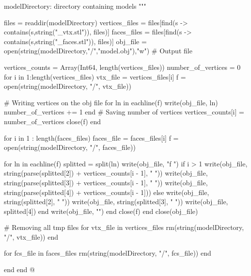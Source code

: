 \documentclass[11pt,oneside]{article}	%
\begin{document}
{  modelDirectory: directory containing models
  """

  files = readdir(modelDirectory)
  vertices_files = files[find(s -> contains(s,string("_vtx.stl")), files)]
  faces_files = files[find(s -> contains(s,string("_faces.stl")), files)]
  obj_file = open(string(modelDirectory,"/","model.obj"),"w") # Output file

  vertices_counts = Array(Int64, length(vertices_files))
  number_of_vertices = 0
  for i in 1:length(vertices_files)
    vtx_file = vertices_files[i]
    f = open(string(modelDirectory, "/", vtx_file))

    # Writing vertices on the obj file
    for ln in eachline(f)
      write(obj_file, ln)
      number_of_vertices += 1
    end
    # Saving number of vertices
    vertices_counts[i] = number_of_vertices
    close(f)
  end

  for i in 1 : length(faces_files)
    faces_file = faces_files[i]
    f = open(string(modelDirectory, "/", faces_file))

    for ln in eachline(f)
      splitted = split(ln)
      write(obj_file, "f ")
      if i > 1
        write(obj_file, string(parse(splitted[2]) + vertices_counts[i - 1], " "))
        write(obj_file, string(parse(splitted[3]) + vertices_counts[i - 1], " "))
        write(obj_file, string(parse(splitted[4]) + vertices_counts[i - 1]))
      else
        write(obj_file, string(splitted[2], " "))
        write(obj_file, string(splitted[3], " "))
        write(obj_file, splitted[4])
      end
      write(obj_file, "\n")
    end
    close(f)
  end
  close(obj_file)

  # Removing all tmp files
  for vtx_file in vertices_files
    rm(string(modelDirectory, "/", vtx_file))
  end

  for fcs_file in faces_files
    rm(string(modelDirectory, "/", fcs_file))
  end

end
end
@}
\end{document}
